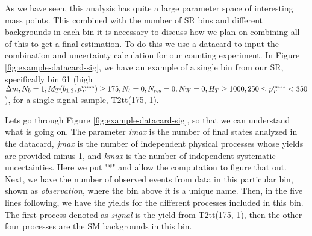 As we have seen, this analysis has quite a large parameter space of interesting mass points. This combined with the number of SR bins and different backgrounds in each bin it is necessary to discuss how we plan on combining all of this to get a final estimation. To do this we use a datacard to input the combination and uncertainty calculation for our counting experiment. In Figure \ref{fig:example-datacard-sig}, we have an example of a single bin from our SR, specifically bin 61 (high $\Delta m, N_{b}=1, M_{T}(b_{1,2},p_{T}^{miss})\geq175, N_{t}=0, N_{\text{res}}=0, N_{W}=0, H_{T}\geq1000, 250\leq p_{T}^{miss}<350$), for a single signal sample, T2tt(175, 1). 

Lets go through Figure \ref{fig:example-datacard-sig}, so that we can understand what is going on. The parameter \textit{imax} is the number of final states analyzed in the datacard, \textit{jmax} is the number of independent physical processes whose yields are provided minus 1, and \textit{kmax} is the number of independent systematic uncertainties. Here we put "*" and allow the computation to figure that out. Next, we have the number of observed events from data in this particular bin, shown as \textit{observation}, where the bin above it is a unique name. Then, in the five lines following, we have the yields for the different processes included in this bin. The first process denoted as \textit{signal} is the yield from T2tt(175, 1), then the other four processes are the SM backgrounds in this bin. 

